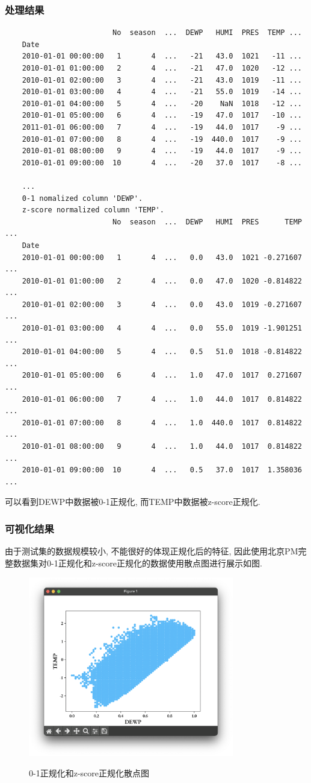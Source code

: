 \subsubsection{处理结果}
\begin{lstlisting}
                         No  season  ...  DEWP   HUMI  PRES  TEMP ...
    Date
    2010-01-01 00:00:00   1       4  ...   -21   43.0  1021   -11 ...
    2010-01-01 01:00:00   2       4  ...   -21   47.0  1020   -12 ...
    2010-01-01 02:00:00   3       4  ...   -21   43.0  1019   -11 ...
    2010-01-01 03:00:00   4       4  ...   -21   55.0  1019   -14 ...
    2010-01-01 04:00:00   5       4  ...   -20    NaN  1018   -12 ...
    2010-01-01 05:00:00   6       4  ...   -19   47.0  1017   -10 ...
    2011-01-01 06:00:00   7       4  ...   -19   44.0  1017    -9 ...
    2010-01-01 07:00:00   8       4  ...   -19  440.0  1017    -9 ...
    2010-01-01 08:00:00   9       4  ...   -19   44.0  1017    -9 ...
    2010-01-01 09:00:00  10       4  ...   -20   37.0  1017    -8 ...

    ...
    0-1 nomalized column 'DEWP'.
    z-score normalized column 'TEMP'.
                         No  season  ...  DEWP   HUMI  PRES      TEMP ...
    Date
    2010-01-01 00:00:00   1       4  ...   0.0   43.0  1021 -0.271607 ...
    2010-01-01 01:00:00   2       4  ...   0.0   47.0  1020 -0.814822 ...
    2010-01-01 02:00:00   3       4  ...   0.0   43.0  1019 -0.271607 ...
    2010-01-01 03:00:00   4       4  ...   0.0   55.0  1019 -1.901251 ...
    2010-01-01 04:00:00   5       4  ...   0.5   51.0  1018 -0.814822 ...
    2010-01-01 05:00:00   6       4  ...   1.0   47.0  1017  0.271607 ...
    2010-01-01 06:00:00   7       4  ...   1.0   44.0  1017  0.814822 ...
    2010-01-01 07:00:00   8       4  ...   1.0  440.0  1017  0.814822 ...
    2010-01-01 08:00:00   9       4  ...   1.0   44.0  1017  0.814822 ...
    2010-01-01 09:00:00  10       4  ...   0.5   37.0  1017  1.358036 ...
\end{lstlisting}
可以看到DEWP中数据被0-1正规化, 而TEMP中数据被z-score正规化.

\subsubsection{可视化结果}
由于测试集的数据规模较小, 不能很好的体现正规化后的特征,
因此使用北京PM完整数据集对0-1正规化和z-score正规化的数据使用散点图进行展示如图.
\begin{figure}
    \centering
    \includegraphics[width=0.8\textwidth]{figures/normalized-scatter.png}
    \label{fig:0-1正规化和z-score正规化散点图}
    \caption{0-1正规化和z-score正规化散点图}
\end{figure}